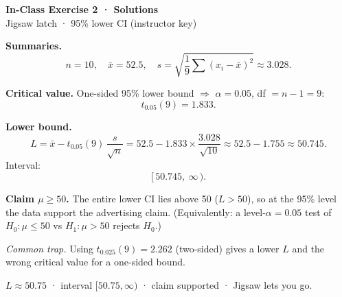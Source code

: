 \documentclass[11pt,a4paper,UTF8]{ctexart}
\begin{document}
\begin{center}
  {\Large\bfseries\color{night} In-Class Exercise 2 · Solutions}\\[0.3em]
  {\normalsize Jigsaw latch · 95\% lower CI (instructor key)}
\end{center}

\vspace{0.6em}

\noindent\textbf{Summaries.}
\[
n=10,\quad
\bar{x}=52.5,\quad
s=\sqrt{\dfrac{1}{9}\sum(x_i-\bar{x})^2}\approx 3.028.
\]

\noindent\textbf{Critical value.}
One-sided 95\% lower bound $\Rightarrow$ $\alpha=0.05$, df $=n-1=9$:
\[
t_{0.05}(9)=1.833.
\]

\noindent\textbf{Lower bound.}
\[
L
=\bar{x}-t_{0.05}(9)\,\dfrac{s}{\sqrt{n}}
=52.5-1.833\times\dfrac{3.028}{\sqrt{10}}
\approx 52.5-1.755
\approx 50.745.
\]
Interval:
\[
[\,50.745,\ \infty\,).
\]

\noindent\textbf{Claim $\mu\ge 50$.}
The entire lower CI lies above 50 ($L>50$), so at the 95\% level the data support the advertising claim.
(Equivalently: a level-$\alpha=0.05$ test of $H_0:\mu\le 50$ vs $H_1:\mu>50$ rejects $H_0$.)

\vspace{0.45em}
\noindent\textit{Common trap.}
Using $t_{0.025}(9)=2.262$ (two-sided) gives a lower $L$ and the wrong critical value for a one-sided bound.

\vspace{0.7em}
\begin{tcolorbox}[colback=blood!5,colframe=blood,title=\textbf{Quick check}]
$L\approx\mathbf{50.75}$ · interval $[50.75,\infty)$ · claim supported · Jigsaw lets you go.
\end{tcolorbox}
\end{document}
